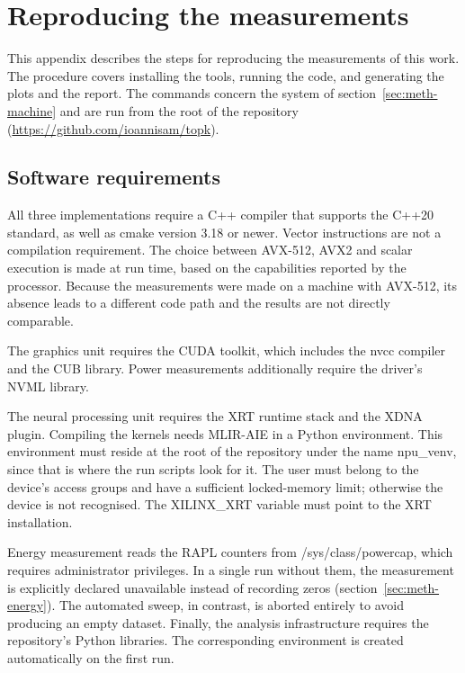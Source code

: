 \chapter{Reproducing the measurements}
\label{app:reproducibility}

This appendix describes the steps for reproducing the measurements of this
work. The procedure covers installing the tools, running the code, and
generating the plots and the report. The commands concern the system of
section~\ref{sec:meth-machine} and are run from the root of the repository
(\url{https://github.com/ioannisam/topk}).

\section{Software requirements}
\label{sec:repro-requirements}

All three implementations require a C++ compiler that supports the C++20
standard, as well as cmake version 3.18 or newer. Vector instructions are not a
compilation requirement. The choice between AVX-512, AVX2 and scalar execution
is made at run time, based on the capabilities reported by the processor.
Because the measurements were made on a machine with AVX-512, its absence leads
to a different code path and the results are not directly comparable.

The graphics unit requires the CUDA toolkit, which includes the nvcc compiler
and the CUB library. Power measurements additionally require the driver's NVML
library.

The neural processing unit requires the XRT runtime stack and the XDNA plugin.
Compiling the kernels needs MLIR-AIE in a Python environment. This environment
must reside at the root of the repository under the name npu\_venv, since that
is where the run scripts look for it. The user must belong to the device's
access groups and have a sufficient locked-memory limit; otherwise the device
is not recognised. The XILINX\_XRT variable must point to the XRT installation.

Energy measurement reads the RAPL counters from /sys/class/powercap, which
requires administrator privileges. In a single run without them, the
measurement is explicitly declared unavailable instead of recording zeros
(section~\ref{sec:meth-energy}). The automated sweep, in contrast, is aborted
entirely to avoid producing an empty dataset. Finally, the analysis
infrastructure requires the repository's Python libraries. The corresponding
environment is created automatically on the first run.

